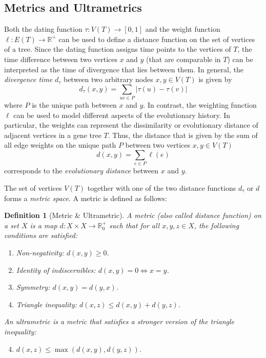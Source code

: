 \documentclass[hidelinks,11pt]{scrreprt}
\newtheorem{definition}[theorem]{Definition}
\begin{document}
\subsection{Metrics and Ultrametrics}
\label{sec:metrics}

Both the dating function $\tau\colon V(T) \to [0,1]$ and the weight function $\ell\colon E(T) \to \mathbb{R}^+$ can be used to define a distance function on the set of vertices of a tree. Since the dating function assigns time points to the vertices of $T$, the time difference between two vertices $x$ and $y$ (that are comparable in $T$) can be interpreted as the time of divergence that lies between them. In general, the \emph{divergence time} $d_{\tau}$ between two arbitrary nodes $x,y \in V(T)$ is given by
\begin{equation}
d_\tau(x,y) = \sum_{uv \in P} |\tau(u) -\tau(v)|
\end{equation}
where $P$ is the unique path between $x$ and $y$. In contrast, the weighting function $\ell$ can be used to model different aspects of the evolutionary history. In particular, the weights can represent the dissimilarity or evolutionary distance of adjacent vertices in a gene tree $T$.
Thus, the distance that is given by the sum of all edge weights on the unique path $P$ between two vertices $x,y \in V(T)$
\begin{equation}
\label{eq:distance_function}
d(x,y) = \sum_{e \in P} \ell(e)
\end{equation}
corresponds to the \emph{evolutionary distance} between $x$ and $y$.

The set of vertices $V(T)$ together with one of the two distance functions $d_\tau$ or $d$ forms a \emph{metric space}. A metric is defined as follows:

\begin{definition}[Metric \& Ultrametric]
	\label{def:metric}
	A \emph{metric} (also called \emph{distance function}) on a set $X$ is a map \mbox{$d\colon X \times X \to \mathbb{R}_0^+$} such that for all $x,y,z \in X$, the following conditions are satisfied:
	\begin{enumerate}[label=(\roman*), itemsep=0.2cm, topsep=0.2cm, parsep=0cm]
		\item \emph{Non-negativity:} $d(x,y) \ge 0$.
		\item \emph{Identity of indiscernibles:} $d(x,y) = 0 \iff x=y$.
		\item \emph{Symmetry:} $d(x,y) = d(y,x)$.
		\item \emph{Triangle inequality:} $d(x,z) \le d(x,y) + d(y,z)$.
	\end{enumerate}
	An \emph{ultrametric} is a metric that satisfies a stronger version of the triangle inequality:
	\begin{enumerate}[label=(\roman**), itemsep=0.2cm, topsep=0.2cm, parsep=0cm]
		\setcounter{enumi}{3}
		\item $d(x,z) \le \max(d(x,y), d(y,z))$.
	\end{enumerate}
\end{definition}
\end{document}
